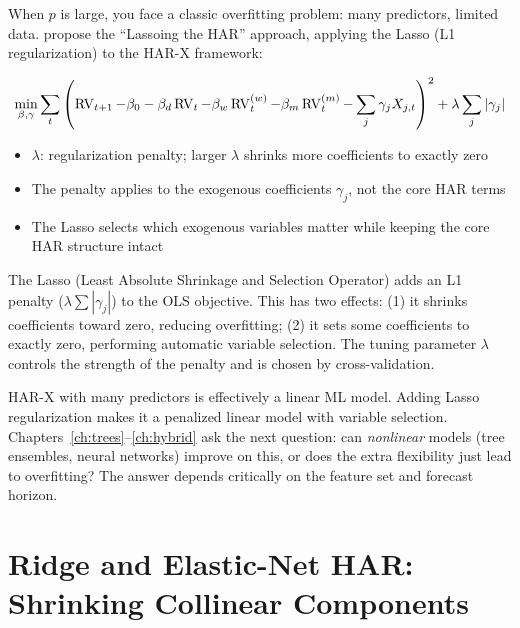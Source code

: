 When $p$ is large, you face a classic overfitting problem: many predictors, limited data.
\citet{AudrinoKnaus2016} propose the ``Lassoing the HAR'' approach, applying the Lasso (L1 regularization) to the HAR-X framework:

\begin{equation}
  \min_{\beta, \gamma} \sum_{t} \left(\operatorname{RV}_{t+1} - \beta_0 - \beta_d \operatorname{RV}_t - \beta_w \operatorname{RV}^{(w)}_t - \beta_m \operatorname{RV}^{(m)}_t - \sum_j \gamma_j X_{j,t}\right)^2 + \lambda \sum_j |\gamma_j|
  \label{eq:lasso-har}
\end{equation}
\begin{itemize}[nosep]
  \item $\lambda$: regularization penalty; larger $\lambda$ shrinks more coefficients to exactly zero
  \item The penalty applies to the exogenous coefficients $\gamma_j$, not the core HAR terms
  \item The Lasso selects which exogenous variables matter while keeping the core HAR structure intact
\end{itemize}

\begin{prereq}
The Lasso (Least Absolute Shrinkage and Selection Operator) adds an L1 penalty ($\lambda \sum |\gamma_j|$) to the OLS objective.
This has two effects: (1) it shrinks coefficients toward zero, reducing overfitting; (2) it sets some coefficients to exactly zero, performing automatic variable selection.
The tuning parameter $\lambda$ controls the strength of the penalty and is chosen by cross-validation.
\end{prereq}

\begin{keyidea}
HAR-X with many predictors is effectively a linear ML model.
Adding Lasso regularization makes it a penalized linear model with variable selection.
Chapters~\ref{ch:trees}--\ref{ch:hybrid} ask the next question: can \emph{nonlinear} models (tree ensembles, neural networks) improve on this, or does the extra flexibility just lead to overfitting?
The answer depends critically on the feature set and forecast horizon.
\end{keyidea}


\section{Ridge and Elastic-Net HAR: Shrinking Collinear Components}
\label{sec:ridge-enet-har}

